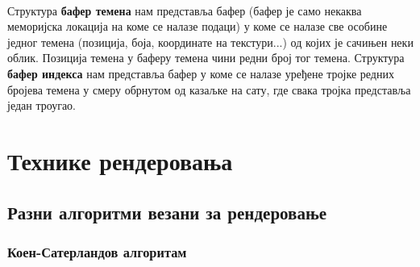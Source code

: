 \documentclass[12pt]{article}
\begin{document}
	\paragraph{}
	Структура \textbf{бафер темена} нам представља бафер (бафер је само некаква меморијска локација на коме се налазе подаци) у коме се налазе све особине једног темена (позиција, боја, координате на текстури...) од којих је сачињен неки облик. Позиција темена у баферу темена чини редни број тог темена. Структура \textbf{бафер индекса} нам представља бафер у коме се налазе уређене тројке редних бројева темена у смеру обрнутом од казаљке на сату, где свака тројка представља један троугао.
	
	\section{Технике рендеровања}
	
	\subsection{Разни алгоритми везани за рендеровање}
	
	\subsubsection{Коен-Сатерландов алгоритам}\label{koensaterland}
\end{document}
